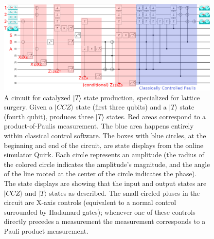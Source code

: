 \documentclass[superscriptaddress,notitlepage,longbibliography]{revtex4-1}
\begin{document}
\begin{figure}[ht]
    \label{fig:catalysis-circuit}
    \centering
    \includegraphics[width=\textwidth,height=\dimexpr\textheight-11\baselineskip,keepaspectratio]{catalysis-circuit.png}
    \caption{
      A circuit for catalyzed $|T\rangle$ state production, specialized for lattice surgery.
      Given a $|CCZ\rangle$ state (first three qubits) and a $|T\rangle$ state (fourth qubit), produces three $|T\rangle$ states.
      Red areas correspond to a product-of-Paulis measurement.
      The blue area happens entirely within classical control software.
      The boxes with blue circles, at the beginning and end of the circuit, are state displays from the online simulator Quirk.
      Each circle represents an amplitude (the radius of the colored circle indicates the amplitude's magnitude, and the angle of the line rooted at the center of the circle indicates the phase).
      The state displays are showing that the input and output states are $|CCZ\rangle$ and $|T\rangle$ states as described.
      The small circled pluses in the circuit are X-axis controls (equivalent to a normal control surrounded by Hadamard gates); whenever one of these controls directly precedes a measurement the measurement corresponds to a Pauli product measurement.
}
\end{figure}
\end{document}
